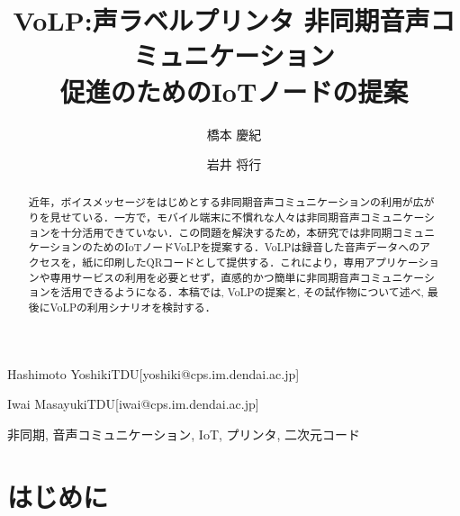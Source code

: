 \documentclass[submit,techrep,noauthor]{ipsj}
\begin{document}
\title{VoLP:声ラベルプリンタ 非同期音声コミュニケーション\\促進のためのIoTノードの提案}

\author{橋本 慶紀}{Hashimoto Yoshiki}{TDU}[yoshiki@cps.im.dendai.ac.jp]
\author{岩井 将行}{Iwai Masayuki}{TDU}[iwai@cps.im.dendai.ac.jp]

\begin{abstract}
近年，ボイスメッセージをはじめとする非同期音声コミュニケーションの利用が広がりを見せている．一方で，モバイル端末に不慣れな人々は非同期音声コミュニケーションを十分活用できていない．この問題を解決するため，本研究では非同期コミュニケーションのためのIoTノードVoLPを提案する．VoLPは録音した音声データへのアクセスを，紙に印刷したQRコードとして提供する．これにより，専用アプリケーションや専用サービスの利用を必要とせず，直感的かつ簡単に非同期音声コミュニケーションを活用できるようになる．本稿では, VoLPの提案と, その試作物について述べ, 最後にVoLPの利用シナリオを検討する．

\end{abstract}

\begin{jkeyword}
非同期, 音声コミュニケーション, IoT, プリンタ, 二次元コード
\end{jkeyword}

\maketitle

\section{はじめに}
\end{document}
